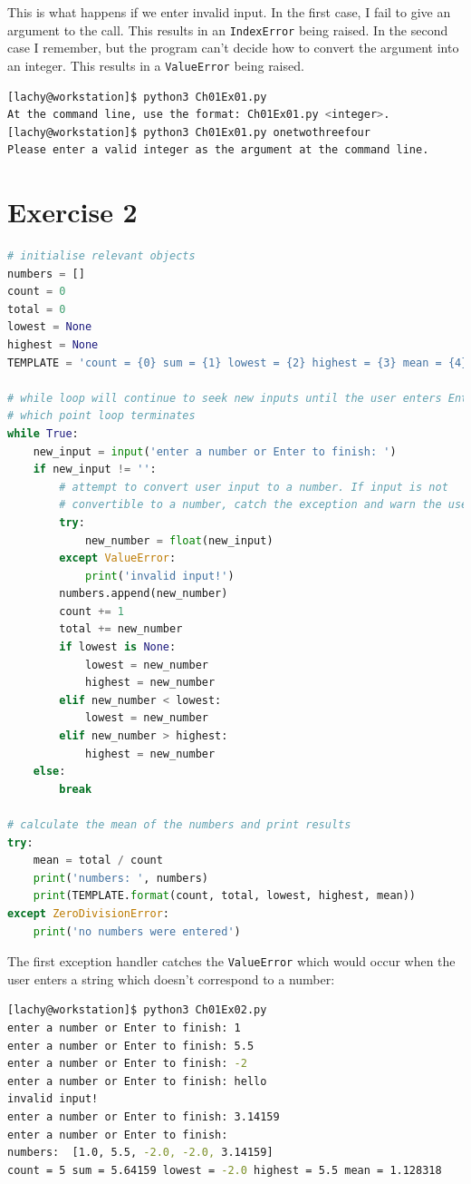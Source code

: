 \documentclass{report}
\begin{document}
\noindent This is what happens if we enter invalid input. In the first case, I fail to give an argument to the call. This results in an \verb|IndexError| being raised. In the second case I remember, but the program can't decide how to convert the argument into an integer. This results in a \verb|ValueError| being raised.
\begin{lstlisting}[language=bash, style=terminalStyle]
[lachy@workstation]$ python3 Ch01Ex01.py
At the command line, use the format: Ch01Ex01.py <integer>.
[lachy@workstation]$ python3 Ch01Ex01.py onetwothreefour
Please enter a valid integer as the argument at the command line.
\end{lstlisting}

\section*{Exercise 2}
\begin{lstlisting}[language=Python, style=pythonStyle]
# initialise relevant objects
numbers = []
count = 0
total = 0
lowest = None
highest = None
TEMPLATE = 'count = {0} sum = {1} lowest = {2} highest = {3} mean = {4}'

# while loop will continue to seek new inputs until the user enters Enter, at 
# which point loop terminates
while True:
    new_input = input('enter a number or Enter to finish: ')
    if new_input != '':
        # attempt to convert user input to a number. If input is not 
        # convertible to a number, catch the exception and warn the user
        try:
            new_number = float(new_input)
        except ValueError:
            print('invalid input!')
        numbers.append(new_number)
        count += 1
        total += new_number
        if lowest is None:
            lowest = new_number
            highest = new_number
        elif new_number < lowest:
            lowest = new_number
        elif new_number > highest:
            highest = new_number
    else:
        break

# calculate the mean of the numbers and print results
try:
    mean = total / count
    print('numbers: ', numbers)
    print(TEMPLATE.format(count, total, lowest, highest, mean))
except ZeroDivisionError:
    print('no numbers were entered')

\end{lstlisting}
The first exception handler catches the \verb|ValueError| which would occur when the user enters a string which doesn't correspond to a number:
\begin{lstlisting}[language=bash, style=terminalStyle]
[lachy@workstation]$ python3 Ch01Ex02.py 
enter a number or Enter to finish: 1
enter a number or Enter to finish: 5.5
enter a number or Enter to finish: -2
enter a number or Enter to finish: hello
invalid input!
enter a number or Enter to finish: 3.14159
enter a number or Enter to finish: 
numbers:  [1.0, 5.5, -2.0, -2.0, 3.14159]
count = 5 sum = 5.64159 lowest = -2.0 highest = 5.5 mean = 1.128318
\end{lstlisting}
\end{document}
